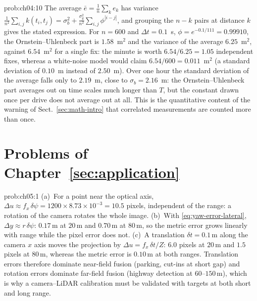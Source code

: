 \documentclass[graybox,envcountchap]{style/SNmono}
\begin{document}
\begin{sol}{prob:ch04:10}
The average $\bar e=\frac{1}n\sum_k e_k$ has variance $\frac{1}{n^{2}}\sum_{i,j}k(t_i,t_j)=\sigma_b^{2}+\frac{\sigma_g^{2}}{n^{2}}\sum_{i,j}\phi^{|i-j|}$, and grouping the $n-k$ pairs at distance $k$ gives the stated expression. For $n=600$ and $\Delta t=0.1$~s, $\phi=e^{-0.1/111}=0.99910$, the Ornstein--Uhlenbeck part is $1.58$~m$^{2}$ and the variance of the average $6.25$~m$^{2}$, against $6.54$~m$^{2}$ for a single fix: the minute is worth $6.54/6.25=1.05$ independent fixes, whereas a white-noise model would claim $6.54/600=0.011$~m$^{2}$ (a standard deviation of $0.10$~m instead of $2.50$~m). Over one hour the standard deviation of the average falls only to $2.19$~m, close to $\sigma_b=2.16$~m: the Ornstein--Uhlenbeck part averages out on time scales much longer than $T$, but the constant drawn once per drive does not average out at all. This is the quantitative content of the warning of Sect.~\ref{sec:math-intro} that correlated measurements are counted more than once.
\end{sol}


\section*{Problems of Chapter~\ref{sec:application}}

\begin{sol}{prob:ch05:1}
(a)~For a point near the optical axis, $\Delta u\approx f_{x}\,\delta\psi=1200\times8.73\times10^{-3}=10.5$ pixels, independent of the range: a rotation of the camera rotates the whole image. (b)~With \eqref{eq:yaw-error-lateral}, $\Delta y\approx r\,\delta\psi$: $0.17$\,m at $20$\,m and $0.70$\,m at $80$\,m, so the metric error grows linearly with range while the pixel error does not. (c)~A translation $\delta t=0.1$\,m along the camera $x$ axis moves the projection by $\Delta u=f_{x}\,\delta t/Z$: $6.0$ pixels at $20$\,m and $1.5$ pixels at $80$\,m, whereas the metric error is $0.10$\,m at both ranges. Translation errors therefore dominate near-field fusion (parking, cut-ins at short gap) and rotation errors dominate far-field fusion (highway detection at $60$--$150$\,m), which is why a camera--LiDAR calibration must be validated with targets at both short and long range.
\end{sol}
\end{document}

